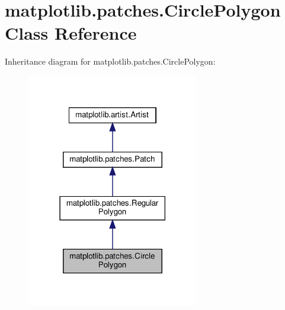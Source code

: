\hypertarget{classmatplotlib_1_1patches_1_1CirclePolygon}{}\section{matplotlib.\+patches.\+Circle\+Polygon Class Reference}
\label{classmatplotlib_1_1patches_1_1CirclePolygon}


Inheritance diagram for matplotlib.\+patches.\+Circle\+Polygon\+:
\nopagebreak
\begin{figure}[H]
\begin{center}
\leavevmode
\includegraphics[width=213pt]{classmatplotlib_1_1patches_1_1CirclePolygon__inherit__graph}
\end{center}
\end{figure}


